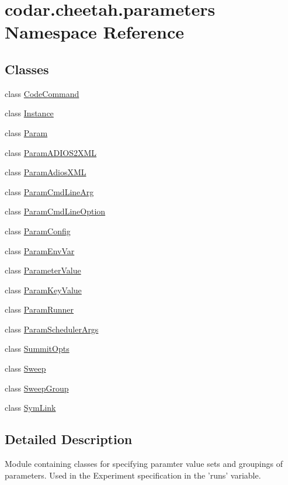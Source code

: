 \hypertarget{namespacecodar_1_1cheetah_1_1parameters}{}\section{codar.\+cheetah.\+parameters Namespace Reference}
\label{namespacecodar_1_1cheetah_1_1parameters}
\subsection*{Classes}
\begin{DoxyCompactItemize}
\item 
class \hyperlink{classcodar_1_1cheetah_1_1parameters_1_1_code_command}{Code\+Command}
\item 
class \hyperlink{classcodar_1_1cheetah_1_1parameters_1_1_instance}{Instance}
\item 
class \hyperlink{classcodar_1_1cheetah_1_1parameters_1_1_param}{Param}
\item 
class \hyperlink{classcodar_1_1cheetah_1_1parameters_1_1_param_a_d_i_o_s2_x_m_l}{Param\+A\+D\+I\+O\+S2\+X\+ML}
\item 
class \hyperlink{classcodar_1_1cheetah_1_1parameters_1_1_param_adios_x_m_l}{Param\+Adios\+X\+ML}
\item 
class \hyperlink{classcodar_1_1cheetah_1_1parameters_1_1_param_cmd_line_arg}{Param\+Cmd\+Line\+Arg}
\item 
class \hyperlink{classcodar_1_1cheetah_1_1parameters_1_1_param_cmd_line_option}{Param\+Cmd\+Line\+Option}
\item 
class \hyperlink{classcodar_1_1cheetah_1_1parameters_1_1_param_config}{Param\+Config}
\item 
class \hyperlink{classcodar_1_1cheetah_1_1parameters_1_1_param_env_var}{Param\+Env\+Var}
\item 
class \hyperlink{classcodar_1_1cheetah_1_1parameters_1_1_parameter_value}{Parameter\+Value}
\item 
class \hyperlink{classcodar_1_1cheetah_1_1parameters_1_1_param_key_value}{Param\+Key\+Value}
\item 
class \hyperlink{classcodar_1_1cheetah_1_1parameters_1_1_param_runner}{Param\+Runner}
\item 
class \hyperlink{classcodar_1_1cheetah_1_1parameters_1_1_param_scheduler_args}{Param\+Scheduler\+Args}
\item 
class \hyperlink{classcodar_1_1cheetah_1_1parameters_1_1_summit_opts}{Summit\+Opts}
\item 
class \hyperlink{classcodar_1_1cheetah_1_1parameters_1_1_sweep}{Sweep}
\item 
class \hyperlink{classcodar_1_1cheetah_1_1parameters_1_1_sweep_group}{Sweep\+Group}
\item 
class \hyperlink{classcodar_1_1cheetah_1_1parameters_1_1_sym_link}{Sym\+Link}
\end{DoxyCompactItemize}


\subsection{Detailed Description}
\begin{DoxyVerb}Module containing classes for specifying paramter value sets and groupings
of parameters. Used in the Experiment specification in the 'runs' variable.
\end{DoxyVerb}
 
